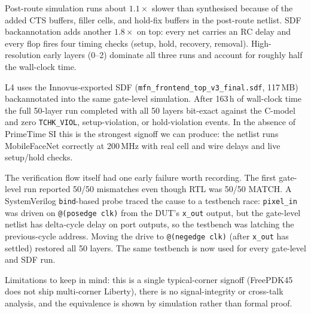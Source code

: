 Post-route simulation runs about $1.1\times$ slower than synthesised because of the added CTS buffers, filler cells, and hold-fix buffers in the post-route netlist. SDF backannotation adds another $1.8\times$ on top: every net carries an RC delay and every flop fires four timing checks (setup, hold, recovery, removal). High-resolution early layers (0--2) dominate all three runs and account for roughly half the wall-clock time.

L4 uses the Innovus-exported SDF (\texttt{mfn\_frontend\_top\_v3\_final.sdf}, 117\,MB) backannotated into the same gate-level simulation. After 163\,h of wall-clock time the full 50-layer run completed with all 50 layers bit-exact against the C-model and zero \texttt{TCHK\_VIOL}, setup-violation, or hold-violation events. In the absence of PrimeTime SI this is the strongest signoff we can produce: the netlist runs MobileFaceNet correctly at 200\,MHz with real cell and wire delays and live setup/hold checks.

The verification flow itself had one early failure worth recording. The first gate-level run reported 50/50 mismatches even though RTL was 50/50 MATCH. A SystemVerilog \texttt{bind}-based probe traced the cause to a testbench race: \texttt{pixel\_in} was driven on \texttt{@(posedge clk)} from the DUT's \texttt{x\_out} output, but the gate-level netlist has delta-cycle delay on port outputs, so the testbench was latching the previous-cycle address. Moving the drive to \texttt{@(negedge clk)} (after \texttt{x\_out} has settled) restored all 50 layers. The same testbench is now used for every gate-level and SDF run.

Limitations to keep in mind: this is a single typical-corner signoff (FreePDK45 does not ship multi-corner Liberty), there is no signal-integrity or cross-talk analysis, and the equivalence is shown by simulation rather than formal proof.
